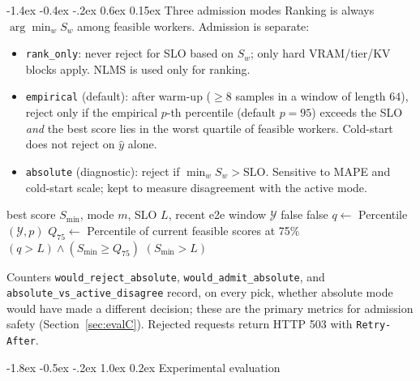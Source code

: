 \documentclass[pdflatex,sn-mathphys-num]{sn-jnl}
\makeatletter
\renewcommand{\section}{\@startsection{section}{1}{\z@}%
  {-1.8ex \@plus -0.5ex \@minus -.2ex}%
  {1.0ex \@plus 0.2ex}%
  {\needspace{4\baselineskip}\normalfont\large\bfseries}}%
\renewcommand{\subsection}{\@startsection{subsection}{2}{\z@}%
  {-1.4ex \@plus -0.4ex \@minus -.2ex}%
  {0.6ex \@plus 0.15ex}%
  {\needspace{3.5\baselineskip}\normalfont\normalsize\bfseries}}%
\makeatother
\begin{document}
\subsection{Three admission modes}
Ranking is always $\arg\min_w S_w$ among feasible workers. Admission is separate:

\begin{itemize}
\item \texttt{rank\_only}: never reject for SLO based on $S_w$; only hard
VRAM/tier/KV blocks apply. NLMS is used only for ranking.
\item \texttt{empirical} (default): after warm-up ($\ge 8$ samples in a window of
length $64$), reject only if the empirical $p$-th percentile (default $p{=}95$)
exceeds the SLO \emph{and} the best score lies in the worst quartile of feasible
workers. Cold-start does not reject on $\hat{y}$ alone.
\item \texttt{absolute} (diagnostic): reject if $\min_w S_w > \mathrm{SLO}$.
Sensitive to MAPE and cold-start scale; kept to measure disagreement with the
active mode.
\end{itemize}

\begin{algorithm}[ht]
\caption{AdmissionReject$(S_{\min}, m)$}
\label{alg:admission}
\begin{algorithmic}[1]
\Require best score $S_{\min}$, mode $m$, SLO $L$, recent e2e window $\mathcal{Y}$
 \Return false
\EndIf
{}
   \Return false 
  \EndIf
  \State $q \leftarrow$ Percentile$(\mathcal{Y},p)$
  \State $Q_{75} \leftarrow$ Percentile of current feasible scores at 75\%
  \State \Return $(q > L) \land (S_{\min} \ge Q_{75})$
\EndIf
\State \Return $(S_{\min} > L)$ 
\end{algorithmic}
\end{algorithm}

Counters \texttt{would\_reject\_absolute}, \texttt{would\_admit\_absolute}, and
\texttt{absolute\_vs\_active\_disagree} record, on every pick, whether absolute mode
would have made a different decision; these are the primary metrics for admission
safety (Section~\ref{sec:evalC}). Rejected requests return HTTP 503 with
\texttt{Retry-After}.

\section{Experimental evaluation}
\label{sec:evaluation}
\end{document}

